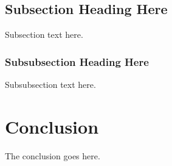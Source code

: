 \documentclass[10pt,journal,compsoc]{IEEEtran}
\begin{document}
%
%
%
%




\subsection{Subsection Heading Here}
Subsection text here.


\subsubsection{Subsubsection Heading Here}
Subsubsection text here.






\section{Conclusion}
The conclusion goes here.






%
\end{document}
